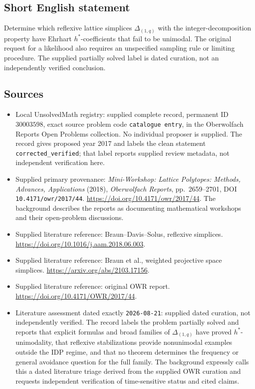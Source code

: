 \documentclass[11pt]{article}
\begin{document}
\subsection{Short English statement}
Determine which reflexive lattice simplices \(\Delta_{(1,q)}\) with the integer-decomposition property have Ehrhart \(h^*\)-coefficients that fail to be unimodal. The original request for a likelihood also requires an unspecified sampling rule or limiting procedure. The supplied partially solved label is dated curation, not an independently verified conclusion.
\subsection{Sources}
\begin{itemize}
\item Local UnsolvedMath registry: supplied complete record, permanent ID \(30003598\), exact source problem code \texttt{catalogue entry}, in the Oberwolfach Reports Open Problems collection. No individual proposer is supplied. The record gives proposed year 2017 and labels the clean statement \texttt{corrected\_verified}; that label reports supplied review metadata, not independent verification here.
\item Supplied primary provenance: \emph{Mini-Workshop: Lattice Polytopes: Methods, Advances, Applications} (2018), \emph{Oberwolfach Reports}, pp.\ 2659--2701, DOI \texttt{10.4171/owr/2017/44}. \url{https://doi.org/10.4171/owr/2017/44}. The background describes the reports as documenting mathematical workshops and their open-problem discussions.
\item Supplied literature reference: Braun--Davis--Solus, reflexive simplices. \url{https://doi.org/10.1016/j.aam.2018.06.003}.
\item Supplied literature reference: Braun et al., weighted projective space simplices. \url{https://arxiv.org/abs/2103.17156}.
\item Supplied literature reference: original OWR report. \url{https://doi.org/10.4171/OWR/2017/44}.
\item Literature assessment dated exactly \texttt{2026-08-21}: supplied dated curation, not independently verified. The record labels the problem partially solved and reports that explicit formulas and broad families of \(\Delta_{(1,q)}\) have proved \(h^*\)-unimodality, that reflexive stabilizations provide nonunimodal examples outside the IDP regime, and that no theorem determines the frequency or general avoidance question for the full family. The background expressly calls this a dated literature triage derived from the supplied OWR curation and requests independent verification of time-sensitive status and cited claims.
\end{itemize}
\end{document}
